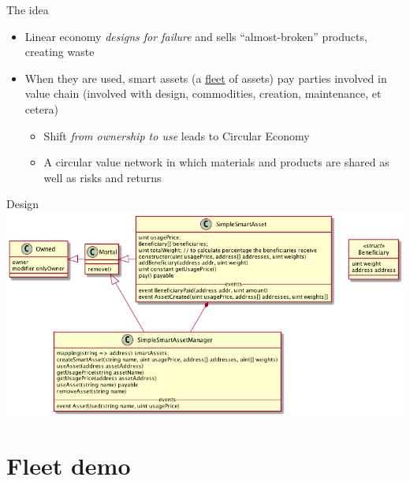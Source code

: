 \documentclass[presentation]{beamer}
\begin{document}
\begin{frame}[label=sec-3-4]{The idea}
\begin{itemize}
\item \alert{Linear economy} \emph{designs for failure} and sells \alert{“almost-broken” products},
creating \alert{waste}
\item When they are used, \alert{smart assets} (a \alert{\uline{fleet}} of assets) pay parties
involved in value chain (involved with design, commodities, creation,
maintenance, et cetera)
\begin{itemize}
\item Shift \alert{\emph{from ownership to use}} leads to \alert{Circular Economy}
\item \alert{A circular value network} in which materials and products are
shared as well as risks and returns
\end{itemize}
\end{itemize}
\end{frame}

\begin{frame}[label=sec-3-5]{Design}
\includegraphics[width=.9\linewidth]{../images/fleet.png}
\end{frame}

\section{Fleet demo}
\label{sec-4}
\end{document}
